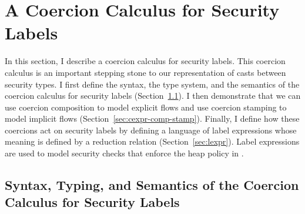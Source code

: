 \section{A Coercion Calculus for Security Labels}
\label{sec:coercion-calc-labels}

In this section, I describe a coercion calculus for security labels. This
coercion calculus is an important stepping stone to our representation of casts
between security types. I first define the syntax, the type system, and the
semantics of the coercion calculus for security labels
(Section~\ref{sec:coercion-calc-def}). I then demonstrate that we can use
coercion composition to model explicit flows and use coercion stamping to model
implicit flows (Section~\ref{sec:cexpr-comp-stamp}). Finally, I define how these
coercions act on security labels by defining a language of label expressions
whose meaning is defined by a reduction relation (Section~\ref{sec:lexpr}).
Label expressions are used to model security checks that enforce the heap policy
in \CC.

\subsection{Syntax, Typing, and Semantics of the Coercion Calculus for Security Labels}
\label{sec:coercion-calc-def}

